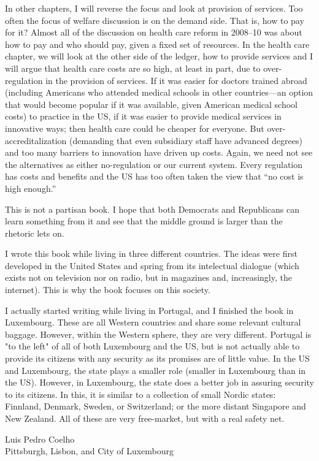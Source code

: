 In other chapters, I will reverse the focus and look at provision of services.
Too often the focus of welfare discussion is on the demand side. That is, how
to pay for it? Almost all of the discussion on health care reform in 2008--10
was about how to pay and who should pay, given a fixed set of resources. In the
health care chapter, we will look at the other side of the ledger, how to
provide services and I will argue that health care costs are so high, at least
in part, due to over-regulation in the provision of services. If it was easier
for doctors trained abroad (including Americans who attended medical schools in
other countries---an option that would become popular if it was available,
given American medical school costs) to practice in the US, if it was easier to
provide medical services in innovative ways; then health care could be cheaper
for everyone. But over-accreditalization (demanding that even subsidiary staff
have advanced degrees) and too many barriers to innovation have driven up
costs. Again, we need not see the alternatives as either no-regulation or our
current system. Every regulation has costs and benefits and the US has too
often taken the view that ``no cost is high enough.''

This is not a partisan book. I hope that both Democrats and Republicans can
learn something from it and see that the middle ground is larger than the
rhetoric lets on.

\bigskip
\bigskip
\bigskip

I wrote this book while living in three different countries. The ideas were
first developed in the United States and spring from its intelectual dialogue
(which exists not on television nor on radio, but in magazines and,
increasingly, the internet). This is why the book focuses on this society.

I actually started writing while living in Portugal, and I finished the book in
Luxembourg. These are all Western countries and share some relevant cultural
baggage. However, within the Western sphere, they are very different. Portugal
is "to the left" of all of both Luxembourg and the US, but is not actually able
to provide its citizens with any security as its promises are of little value.
In the US and Luxembourg, the state plays a smaller role (smaller in Luxembourg
than in the US). However, in Luxembourg, the state does a better job in
assuring security to its citizens.  In this, it is similar to a collection of
small Nordic states: Finnland, Denmark, Sweden, or Switzerland; or the more
distant Singapore and New Zealand.  All of these are very free-market, but with
a real safety net.

\begin{flushright}
Luis Pedro Coelho\\
Pittsburgh, Lisbon, and City of Luxembourg
\end{flushright}

